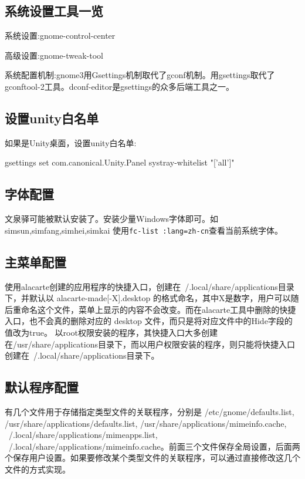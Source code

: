 \subsection{系统设置工具一览}

系统设置:gnome-control-center

高级设置:gnome-tweak-tool

系统配置机制:gnome3用Gsettings机制取代了gconf机制。用gsettings取代了gconftool-2工具。dconf-editor是gsettings的众多后端工具之一。

\subsection{设置unity白名单}
如果是Unity桌面，设置unity白名单:
\begin{shellcmd}
gsettings set com.canonical.Unity.Panel systray-whitelist "['all']"
\end{shellcmd}

\subsection{字体配置}
文泉驿可能被默认安装了。安装少量Windows字体即可。如simsun,simfang,simhei,simkai
使用\verb+fc-list :lang=zh-cn+查看当前系统字体。

\subsection{主菜单配置}
使用alacarte创建的应用程序的快捷入口，创建在~/.local/share/applications目录下，并默认以 alacarte-made[-X].desktop 的格式命名，其中X是数字，用户可以随后重命名这个文件，菜单上显示的内容不会改变。而在alacarte工具中删除的快捷入口，也不会真的删除对应的 desktop 文件，而只是将对应文件中的Hide字段的值改为true。
以root权限安装的程序，其快捷入口大多创建在/usr/share/applications目录下，而以用户权限安装的程序，则只能将快捷入口创建在~/.local/share/applications目录下。

\subsection{默认程序配置}
有几个文件用于存储指定类型文件的关联程序，分别是 /etc/gnome/defaults.list, /usr/share/applications/defaults.list, /usr/share/applications/mimeinfo.cache, ~/.local/share/applications/mimeapps.list, ~/.local/share/applications/mimeinfo.cache。前面三个文件保存全局设置，后面两个保存用户设置。如果要修改某个类型文件的关联程序，可以通过直接修改这几个文件的方式实现。

